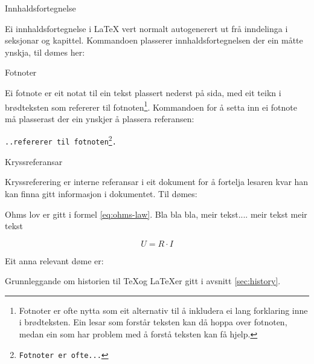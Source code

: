 	\begin{frame}{Innhaldsfortegnelse}
	
	Ei innhaldsfortegnelse i \LaTeX{} vert normalt autogenerert ut frå inndelinga i seksjonar og kapittel. Kommandoen \texttt{\tableofcontents} plasserer innhaldsfortegnelsen der ein måtte ynskja, til dømes her:
	
	\tableofcontents
\end{frame}

\begin{frame}{Fotnoter}
	
	Ei fotnote er eit notat til ein tekst plassert nederst på sida, med eit teikn i brødteksten som refererer til fotnoten\footnote{Fotnoter er ofte nytta som eit alternativ til å inkludera ei lang forklaring inne i brødteksten. Ein lesar som forstår teksten kan då hoppa over fotnoten, medan ein som har problem med å forstå teksten kan få hjelp.}. Kommandoen for å setta inn ei fotnote må plasserast der ein ynskjer å plassera referansen:
	
	\texttt{..refererer til fotnoten\footnote{Fotnoter er ofte...}.}
	
\end{frame}

\begin{frame}{Kryssreferansar}
	
	Kryssreferering er interne referansar i eit dokument for å fortelja lesaren kvar han kan finna gitt informasjon i dokumentet. Til dømes:
	
	\begin{displayquote}
		Ohms lov er gitt i formel \eqref{eq:ohms-law}. Bla bla bla, meir tekst.... meir tekst meir tekst
		
		\begin{equation}
			U = R \cdot I
			\label{eq:ohms-law}
		\end{equation}
		
	\end{displayquote}
	
	Eit anna relevant døme er:
	
	\begin{displayquote}
		Grunnleggande om historien til \TeX og \LaTeX er gitt i avsnitt \ref{sec:history}.
	\end{displayquote}
	
\end{frame}







